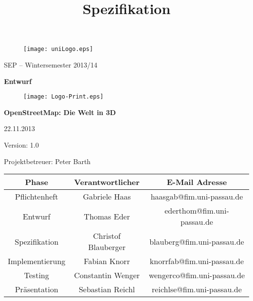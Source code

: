 \documentclass[10pt]{scrreprt}
\begin{document}
\thispagestyle{empty}
\sffamily
 
\title{Spezifikation}

\begin{figure}
\begin{flushright}
	\texttt{[image: uniLogo.eps]}
\vspace{2.0 cm}
\end{flushright}
\end{figure}

\begin{center}
\vspace{2.0 cm}
{\LARGE SEP – Wintersemester 2013/14}

\vspace{1.0 cm}
\textbf{{\Huge Entwurf}}

\vspace{0.8 cm}
\begin{figure}[!htb]
\begin{center}
	\texttt{[image: Logo-Print.eps]}
\end{center}
\end{figure}

\vspace{0.2 cm}
\textbf{{\huge OpenStreetMap: Die Welt in 3D}}

\vspace{1.5 cm}
22.11.2013

\vspace{0.5 cm}
Version: 1.0

\vspace{1.5 cm}
{\Large Projektbetreuer: Peter Barth}

\vspace{1.5 cm}
\begin{tabular}{|c|c|c|}
\hline 
\rule[-1ex]{0pt}{4ex} \textbf{Phase} & \textbf{Verantwortlicher} & \textbf{E-Mail Adresse} \\ 
\hline  \hline
\rule[-1ex]{0pt}{4ex} Pflichtenheft & Gabriele Haas & haasgab@fim.uni-passau.de \\ 
\hline  \hline
\rule[-1ex]{0pt}{4ex} Entwurf & Thomas Eder & ederthom@fim.uni-passau.de \\ 
\hline  \hline
\rule[-1ex]{0pt}{4ex} Spezifikation & Christof Blauberger & blauberg@fim.uni-passau.de \\ 
\hline  \hline
\rule[-1ex]{0pt}{4ex} Implementierung & Fabian Knorr & knorrfab@fim.uni-passau.de \\ 
\hline \hline 
\rule[-1ex]{0pt}{4ex} Testing & Constantin Wenger & wengerco@fim.uni-passau.de \\ 
\hline  \hline
\rule[-1ex]{0pt}{4ex} Präsentation & Sebastian Reichl & reichlse@fim.uni-passau.de \\ 
\hline 
\end{tabular}

\end{center}
\end{document}
